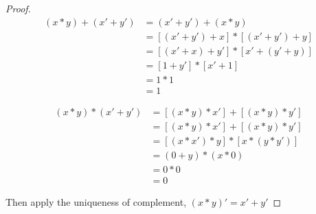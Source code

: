 \begin{proof}

\begin{align*}
    (x * y) + (x' + y')
& = (x' + y') + (x * y) \\
& = [(x' + y') + x] * [(x' + y') + y] \\
& = [(x' + x) + y'] * [x' + (y' + y)] \\
& = [1 + y'] * [x' + 1] \\
& = 1 * 1 \\
& = 1
\end{align*}

\begin{align*}
    (x * y) * (x' + y')
& = [(x * y) * x'] + [(x * y) * y'] \\
& = [(x * y) * x'] + [(x * y) * y'] \\
& = [(x * x') * y] * [x * (y * y')] \\
& = (0 + y) * (x * 0) \\
& = 0 * 0 \\
& = 0
\end{align*}

Then apply the uniqueness of complement, $(x * y)' = x' + y'$
\end{proof}
